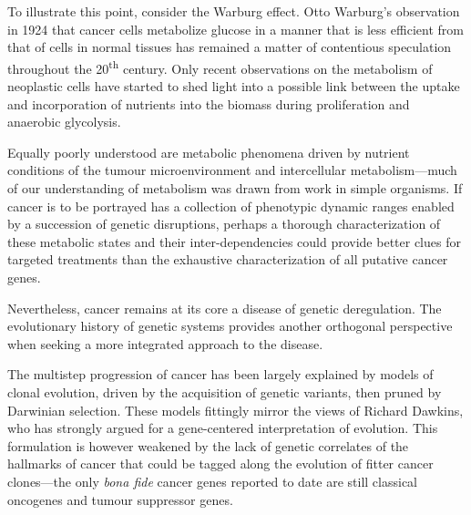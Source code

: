 
To illustrate this point, consider the Warburg effect.  Otto Warburg's
observation in 1924 that cancer cells metabolize glucose in a manner that is
less efficient from that of cells in normal tissues\cite{warburg_ueber_1924} has
remained a matter of contentious speculation throughout the
20\textsuperscript{th} century.  Only recent observations on the metabolism of
neoplastic cells have started to shed light into a possible link between the
uptake and incorporation of nutrients into the biomass during proliferation and
anaerobic glycolysis.\cite{heiden_understanding_2009}

Equally poorly understood are metabolic phenomena driven by nutrient conditions
of the tumour microenvironment and intercellular metabolism---much of our
understanding of metabolism was drawn from work in simple
organisms.\cite{hsu_cancer_2008} If cancer is to be portrayed has a collection
of phenotypic dynamic ranges enabled by a succession of genetic disruptions,
perhaps a thorough characterization of these metabolic states and their
inter-dependencies could provide better clues for targeted treatments than the
exhaustive characterization of all putative cancer
genes.\cite{kroemer_tumor_2008}

\medskip{}

Nevertheless, cancer remains at its core a disease of genetic deregulation.  The
evolutionary history of genetic systems provides another orthogonal perspective
when seeking a more integrated approach to the disease.

The multistep progression of cancer has been largely explained by models of
clonal evolution, driven by the acquisition of genetic variants, then pruned by
Darwinian selection.\cite{greaves_clonal_2012} These models fittingly mirror the
views of Richard Dawkins, who has strongly argued for a gene-centered
interpretation of evolution.\cite{dawkins_selfish_1976} This formulation is
however weakened by the lack of genetic correlates of the hallmarks of cancer
that could be tagged along the evolution of fitter cancer clones---the only
\emph{bona fide} cancer genes reported to date are still classical oncogenes and
tumour suppressor genes.

